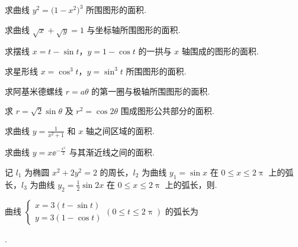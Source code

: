 	\begin{ti}
		求曲线 $y^{2} = \bigl( 1 - x^{2} \bigr)^{3}$ 所围图形的面积.
	\end{ti}

	\begin{ti}
		求曲线 $\sqrt{x} + \sqrt{y} = 1$ 与坐标轴所围图形的面积.
	\end{ti}

	\begin{ti}
		求摆线 $x = t - \sin t$，$y = 1 - \cos t$ 的一拱与 $x$ 轴围成的图形的面积.
	\end{ti}

	\begin{ti}
		求星形线 $x = \cos^{3}t$，$y = \sin^{3}t$ 所围图形的面积.
	\end{ti}

	\begin{ti}
		求阿基米德螺线 $r = a \theta$ 的第一圈与极轴所围图形的面积.
	\end{ti}

	\begin{ti}
		求 $r = \sqrt{2} \sin \theta$ 及 $r^{2} = \cos 2 \theta$ 围成图形公共部分的面积.
	\end{ti}

	\begin{ti}
		求曲线 $y = \frac{1}{x^{2} + 1}$ 和 $x$ 轴之间区域的面积.
	\end{ti}

	\begin{ti}
		求曲线 $y = x \ee^{-\frac{x^{2}}{2}}$ 与其渐近线之间的面积.
	\end{ti}

	\begin{ti}
		记 $l_{1}$ 为椭圆 $x^{2} + 2y^{2} = 2$ 的周长，$l_{2}$ 为曲线 $y_{1} = \sin x$ 在 $0 \leq x \leq 2\uppi$ 上的弧长，$l_{3}$ 为曲线 $y_{2} = \frac{1}{2} \sin 2x$ 在 $0 \leq x \leq 2\uppi$ 上的弧长，则\kuo.

	\end{ti}

	\begin{ti}
		曲线 $\begin{cases}
			x = 3 (t - \sin t)\\
			y = 3 (1 - \cos t)
		\end{cases} (0 \leq t \leq 2\uppi)$ 的弧长为
		
		\noindent\hone{4}.
	\end{ti}

